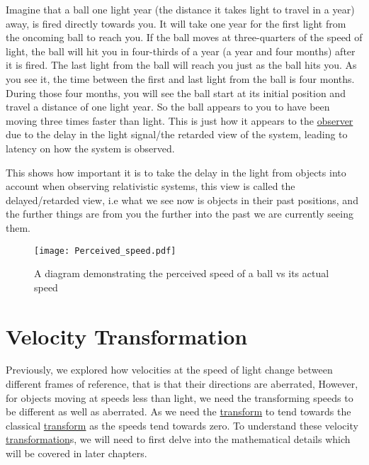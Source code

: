Imagine that a ball one light year (the distance it takes light to travel in a year) away, is fired directly towards you. It will take one year for the first light from the oncoming ball to reach you. If the ball moves at three-quarters of the speed of light, the ball will hit you in four-thirds of a year (a year and four months) after it is fired. The last light from the ball will reach you just as the ball hits you. As you see it, the time between the first and last light from the ball is four months. During those four months, you will see the ball start at its initial position and travel a distance of one light year. So the ball appears to you to have been moving three times faster than light. This is just how it appears to the \hyperlink{def-observer}{observer} due to the delay in the light signal/the retarded view of the system, leading to latency on how the system is observed.

This shows how important it is to take the delay in the light from objects into account when observing relativistic systems, this view is called the delayed/retarded view, i.e what we see now is objects in their past positions, and the further things are from you the further into the past we are currently seeing them. 

\begin{figure}[H]
\centering
\texttt{[image: Perceived\_speed.pdf]}
    \caption{A diagram demonstrating the perceived speed of a ball vs its actual speed}
    \label{fig: perceived vs actual speed}
\end{figure}


\section{Velocity Transformation}

Previously, we explored how velocities at the speed of light change between different frames of reference, that is that their directions are aberrated, However, for objects moving at speeds less than light, we need the transforming speeds to be different as well as aberrated. As we need the \hyperlink{def-transform}{transform} to tend towards the classical \hyperlink{def-transform}{transform} as the speeds tend towards zero. To understand these velocity \hyperlink{def-transform}{transformation}s, we will need to first delve into the mathematical details which will be covered in later chapters.


